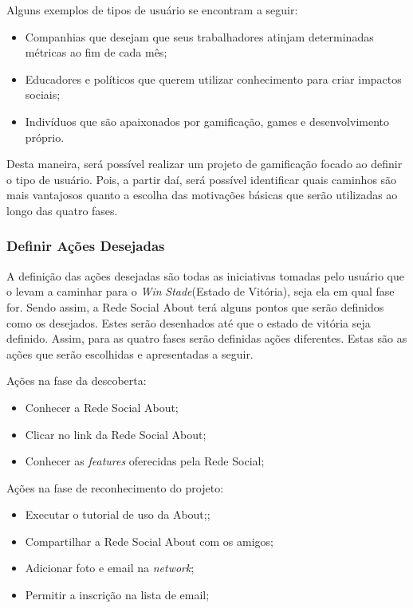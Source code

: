 Alguns exemplos de tipos de usuário se encontram a seguir:

\begin{itemize}
    \item Companhias que desejam que seus trabalhadores atinjam determinadas métricas
        ao fim de cada mês;
    \item Educadores e políticos que querem utilizar conhecimento para criar impactos
        sociais;
    \item Indivíduos que são apaixonados por gamificação, games e desenvolvimento próprio.
\end{itemize}

Desta maneira, será possível realizar um projeto de gamificação focado ao definir o tipo
de usuário. Pois, a partir daí, será possível identificar quais caminhos são mais vantajosos
quanto a escolha das motivações básicas que serão utilizadas ao longo das quatro fases.

\subsubsection{Definir Ações Desejadas}
\label{sub:define_desired_actions}
A definição das ações desejadas são todas as iniciativas tomadas pelo usuário que o 
levam a caminhar para
o \textit{Win} \textit{Stade}(Estado de Vitória), seja ela em qual fase for. Sendo assim, a Rede Social
About terá alguns pontos que serão definidos como os desejados. Estes serão desenhados
até que o estado de vitória seja definido. Assim, para as quatro fases serão definidas
ações diferentes. Estas são as  ações que serão escolhidas e apresentadas
a seguir.

Ações na fase da descoberta:
\begin{itemize}
    \item Conhecer a Rede Social About;
    \item Clicar no link da Rede Social About;
    \item Conhecer as \textit{features} oferecidas pela Rede Social;
\end{itemize}


Ações na fase de reconhecimento do projeto: 
\begin{itemize}
    \item Executar o tutorial de uso da About;;
    \item Compartilhar a Rede Social About com os amigos;
    \item Adicionar foto e email na \textit{network};
    \item Permitir a inscrição na lista de email;
\end{itemize}

